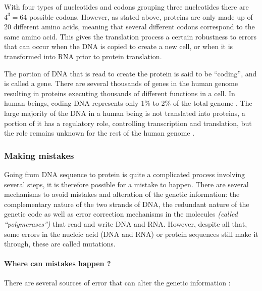 \documentclass[
  11pt,
  twoside]{scrbook}
\begin{document}
With four types of nucleotides and codons grouping three nucleotides there are \(4^3=64\) possible codons. However, as stated above, proteins are only made up of 20 different amino acids, meaning that several different codons correspond to the same amino acid. This gives the translation process a certain robustness to errors that can occur when the DNA is copied to create a new cell, or when it is transformed into RNA prior to protein translation.

The portion of DNA that is read to create the protein is said to be ``coding'', and is called a gene. There are several thousands of genes in the human genome \autocite{internationalhumangenomesequencingconsortiumFinishingEuchromaticSequence2004} resulting in proteins executing thousands of different functions in a cell. In human beings, coding DNA represents only 1\% to 2\% of the total genome \autocite{elkonCharacterizationNoncodingRegulatory2017,omennReflectionsHUPOHuman2021}. The large majority of the DNA in a human being is not translated into proteins, a portion of it has a regulatory role, controlling transcription and translation, but the role remains unknown for the rest of the human genome \autocite{shabalinaMammalianTranscriptomeFunction2004,IntegratedEncyclopediaDNA2012}.

\hypertarget{making-mistakes}{%
\subsubsection{Making mistakes}\label{making-mistakes}}

Going from DNA sequence to protein is quite a complicated process involving several steps, it is therefore possible for a mistake to happen. There are several mechanisms to avoid mistakes and alteration of the genetic information: the complementary nature of the two strands of DNA, the redundant nature of the genetic code as well as error correction mechanisms in the molecules \emph{(called ``polymerases'')} that read and write DNA and RNA. However, despite all that, some errors in the nucleic acid (DNA and RNA) or protein sequences still make it through, these are called mutations.

\hypertarget{where-can-mistakes-happen}{%
\paragraph{Where can mistakes happen ?}\label{where-can-mistakes-happen}}

There are several sources of error that can alter the genetic information \autocite{chatterjee2017}:
\end{document}
